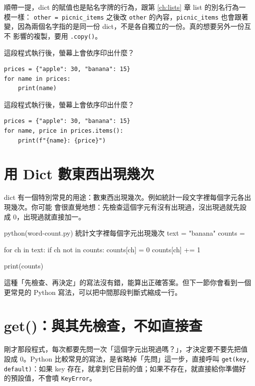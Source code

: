 順帶一提，dict 的賦值也是貼名字牌的行為，跟第 \ref{ch:lists} 章 list 的別名行為一模一樣：
\texttt{other = picnic\_items} 之後改 \texttt{other} 的內容，\texttt{picnic\_items}
也會跟著變，因為兩個名字指的是同一份 dict，不是各自獨立的一份。真的想要另外一份互不
影響的複製，要用 \texttt{.copy()}。

\begin{drills}[label=drills:dict-iterate]
\item 這段程式執行後，螢幕上會依序印出什麼？
\begin{verbatim}
prices = {"apple": 30, "banana": 15}
for name in prices:
    print(name)
\end{verbatim}
\item 這段程式執行後，螢幕上會依序印出什麼？
\begin{verbatim}
prices = {"apple": 30, "banana": 15}
for name, price in prices.items():
    print(f"{name}: {price}")
\end{verbatim}
\end{drills}

\section{用 Dict 數東西出現幾次}
\label{sec:dict-counter}

dict 有一個特別常見的用途：數東西出現幾次。例如統計一段文字裡每個字元各出現幾次。你可能
會很直覺地想：先檢查這個字元有沒有出現過，沒出現過就先設成 0，出現過就直接加一。

\begin{example}{python}{(word-count.py) 統計文字裡每個字元出現幾次}
text = "banana"
counts = {}

for ch in text:
    if ch not in counts:
        counts[ch] = 0
    counts[ch] += 1

print(counts)
\end{example}


這種「先檢查、再決定」的寫法沒有錯，能算出正確答案。但下一節你會看到一個更常見的
Python 寫法，可以把中間那段判斷式縮成一行。

\section{get()：與其先檢查，不如直接查}
\label{sec:dict-get}

剛才那段程式，每次都要先問一次「這個字元出現過嗎？」，才決定要不要先把值設成 0。Python
比較常見的寫法，是省略掉「先問」這一步，直接呼叫 \texttt{get(key, default)}：如果 key
存在，就拿到它目前的值；如果不存在，就直接給你準備好的預設值，不會噴 \texttt{KeyError}。

